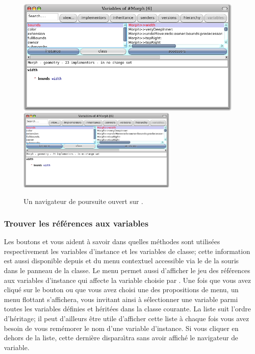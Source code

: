 \documentclass[a4paper,10pt,twoside]{book}
\begin{document}
\begin{figure}[btp]
	\begin{center}
	\ifluluelse
		{\includegraphics[width=\textwidth]{chasingBrowser}}
		{\includegraphics[width=0.7\textwidth]{chasingBrowser}}
	\end{center}
	\caption{Un navigateur de poursuite ouvert sur .}
\end{figure}

\subsubsection{Trouver les r\'ef\'erences aux variables}


Les boutons  et  vous aident \`a savoir
dans quelles m\'ethodes sont utilis\'ees respectivement les variables d'instance
et les variables de classe; cette information est aussi disponible depuis 
 et  du menu contextuel accessible via le 
 de la souris dans le panneau de la classe.
Le menu permet aussi d'afficher le jeu 
des r\'ef\'erences aux variables d'instance qui affecte la variable choisie
par .
Une fois que vous avez cliqu\'e sur le bouton ou que vous avez choisi une
des propositions de menu, un menu flottant s'affichera, vous invitant ainsi
\`a s\'electionner une variable parmi toutes les variables d\'efinies et
h\'erit\'ees dans la classe courante.
La liste suit l'ordre d'h\'eritage; il peut d'ailleurs \^etre utile d'afficher
cette liste \`a chaque fois vous avez besoin de vous rem\'emorer le nom d'une
variable d'instance. Si vous cliquer en dehors de la liste, cette derni\`ere
dispara\^{\i}tra sans avoir affich\'e le navigateur de variable.
\end{document}
